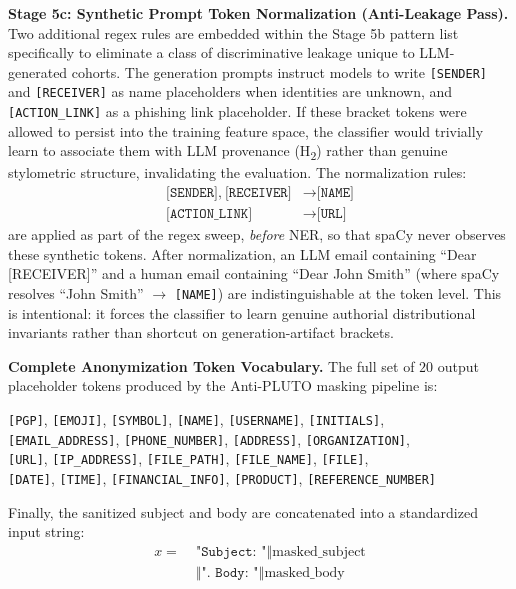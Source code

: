 \documentclass[journal]{IEEEtran}
\begin{document}
\textbf{Stage 5c: Synthetic Prompt Token Normalization (Anti-Leakage Pass).} Two additional regex rules are embedded within the Stage 5b pattern list specifically to eliminate a class of discriminative leakage unique to LLM-generated cohorts. The generation prompts instruct models to write \texttt{[SENDER]} and \texttt{[RECEIVER]} as name placeholders when identities are unknown, and \texttt{[ACTION\_LINK]} as a phishing link placeholder. If these bracket tokens were allowed to persist into the training feature space, the classifier would trivially learn to associate them with LLM provenance (H\textsubscript{2}) rather than genuine stylometric structure, invalidating the evaluation. The normalization rules:
\begin{align*}
    \texttt{[SENDER]},\ \texttt{[RECEIVER]} &\longrightarrow \texttt{[NAME]} \\
    \texttt{[ACTION\_LINK]} &\longrightarrow \texttt{[URL]}
\end{align*}
are applied as part of the regex sweep, \emph{before} NER, so that spaCy never observes these synthetic tokens. After normalization, an LLM email containing ``Dear [RECEIVER]'' and a human email containing ``Dear John Smith'' (where spaCy resolves ``John Smith'' $\to$ \texttt{[NAME]}) are indistinguishable at the token level. This is intentional: it forces the classifier to learn genuine authorial distributional invariants rather than shortcut on generation-artifact brackets.

\textbf{Complete Anonymization Token Vocabulary.} The full set of $20$ output placeholder tokens produced by the Anti-PLUTO masking pipeline is:
\begin{center}
\small
\texttt{[PGP]}, \texttt{[EMOJI]}, \texttt{[SYMBOL]}, \texttt{[NAME]}, \texttt{[USERNAME]}, \texttt{[INITIALS]},\\
\texttt{[EMAIL\_ADDRESS]}, \texttt{[PHONE\_NUMBER]}, \texttt{[ADDRESS]}, \texttt{[ORGANIZATION]},\\
\texttt{[URL]}, \texttt{[IP\_ADDRESS]}, \texttt{[FILE\_PATH]}, \texttt{[FILE\_NAME]}, \texttt{[FILE]},\\
\texttt{[DATE]}, \texttt{[TIME]}, \texttt{[FINANCIAL\_INFO]}, \texttt{[PRODUCT]}, \texttt{[REFERENCE\_NUMBER]}
\end{center}

Finally, the sanitized subject and body are concatenated into a standardized input string:
\begin{equation}
\begin{aligned}
    x = \; & \texttt{"Subject: "} \mathbin{\Vert} \text{masked\_subject} \\
    & \mathbin{\Vert} \texttt{". Body: "} \mathbin{\Vert} \text{masked\_body}
\end{aligned}
\end{equation}
\end{document}
